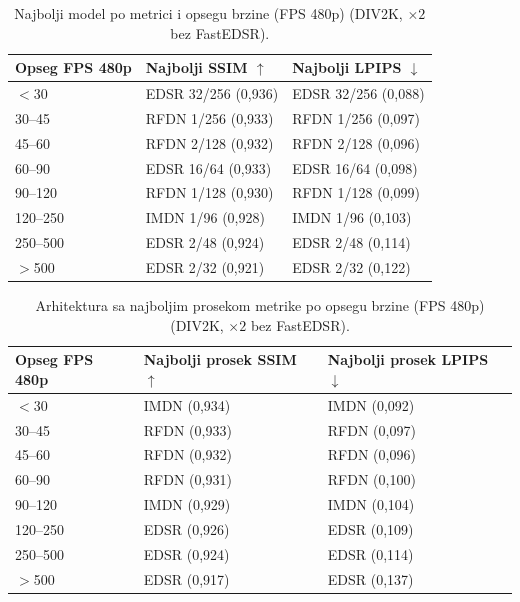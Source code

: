 
\begin{table}[H]
    \centering
    \caption{Najbolji model po metrici i opsegu brzine (FPS 480p) (DIV2K, $\times2$ bez FastEDSR).}
    \label{tab:fps_bins_best_model_2x_DIV2K}
    \small
    \setlength{\tabcolsep}{4pt}
    \begin{tabular}{@{}lll@{}}
        \toprule
        Opseg FPS 480p & Najbolji SSIM $\uparrow$ & Najbolji LPIPS $\downarrow$ \\
        \midrule
        $<$30 & EDSR 32/256 (0,936) & EDSR 32/256 (0,088) \\
        30--45 & RFDN 1/256 (0,933) & RFDN 1/256 (0,097) \\
        45--60 & RFDN 2/128 (0,932) & RFDN 2/128 (0,096) \\
        60--90 & EDSR 16/64 (0,933) & EDSR 16/64 (0,098) \\
        90--120 & RFDN 1/128 (0,930) & RFDN 1/128 (0,099) \\
        120--250 & IMDN 1/96 (0,928) & IMDN 1/96 (0,103) \\
        250--500 & EDSR 2/48 (0,924) & EDSR 2/48 (0,114) \\
        $>$500 & EDSR 2/32 (0,921) & EDSR 2/32 (0,122) \\
        \bottomrule
    \end{tabular}
\end{table}

\begin{table}[H]
    \centering
    \caption{Arhitektura sa najboljim prosekom metrike po opsegu brzine (FPS 480p) (DIV2K, $\times2$ bez FastEDSR).}
    \label{tab:fps_bins_best_arch_2x_DIV2K}
    \small
    \setlength{\tabcolsep}{4pt}
    \begin{tabular}{@{}lll@{}}
        \toprule
        Opseg FPS 480p & Najbolji prosek SSIM $\uparrow$ & Najbolji prosek LPIPS $\downarrow$ \\
        \midrule
        $<$30 & IMDN (0,934) & IMDN (0,092) \\
        30--45 & RFDN (0,933) & RFDN (0,097) \\
        45--60 & RFDN (0,932) & RFDN (0,096) \\
        60--90 & RFDN (0,931) & RFDN (0,100) \\
        90--120 & IMDN (0,929) & IMDN (0,104) \\
        120--250 & EDSR (0,926) & EDSR (0,109) \\
        250--500 & EDSR (0,924) & EDSR (0,114) \\
        $>$500 & EDSR (0,917) & EDSR (0,137) \\
        \bottomrule
    \end{tabular}
\end{table}
